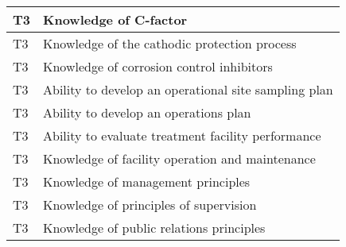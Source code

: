 \begin{table}[H]
\begin{tabular}{| m{1cm} |m{15cm} |}
T3 & Knowledge of C-factor                                                                                          \\ \hline
T3 & Knowledge of the   cathodic protection process                                                                 \\ \hline
T3 & Knowledge of   corrosion control inhibitors                                                                    \\ \hline
T3 & Ability to develop an   operational site sampling plan                                                         \\ \hline
T3 & Ability to develop an   operations plan                                                                        \\ \hline
T3 & Ability to evaluate   treatment facility performance                                                           \\ \hline
T3 & Knowledge of facility   operation and maintenance                                                              \\ \hline
T3 & Knowledge of   management principles                                                                           \\ \hline
T3 & Knowledge of   principles of supervision                                                                       \\ \hline
T3 & Knowledge of public   relations principles                                                                     \\ \hline
\end{tabular}
\end{table}
\newpage

